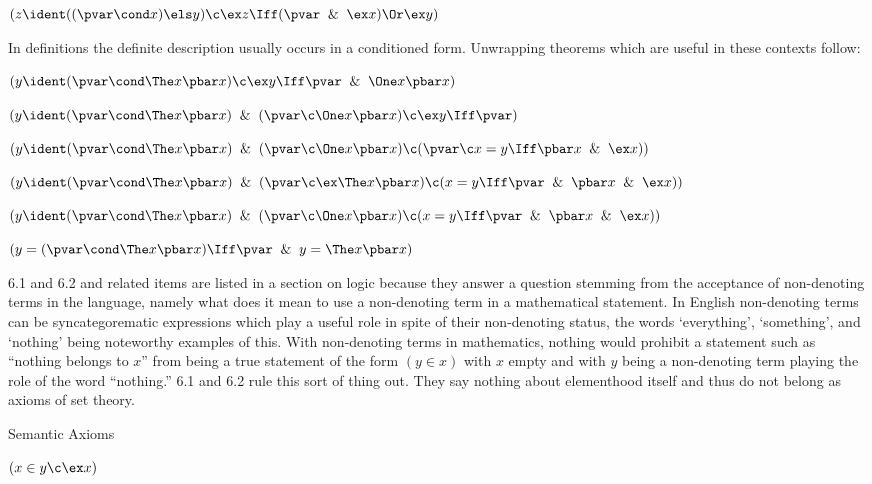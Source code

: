  $(z \ident ((\pvar \cond x) \els y) \c \ex z \Iff (\pvar \And \ex x)\Or \ex y)$
\lineb


In definitions the definite description usually occurs in a conditioned form.
Unwrapping theorems which are useful in these contexts follow:
	\lineb

 $(y \ident(\pvar \cond\The x\pbar x)
\c \ex y \Iff \pvar \And \One x\pbar x)$

 $(y \ident(\pvar \cond\The x\pbar x)
\And (\pvar \c \One x\pbar x)
\c \ex y \Iff \pvar )$

 $(y \ident (\pvar \cond \The x\pbar x) \And
	(\pvar \c \One x \pbar x) 
	\c (\pvar \c x = y \Iff \pbar x \And \ex x)) $

 $(y \ident (\pvar \cond \The x\pbar x) \And
	(\pvar \c \ex \The x \pbar x) 
	\c (x = y \Iff \pvar \And \pbar x \And \ex x)) $

 $(y \ident (\pvar \cond \The x\pbar x) \And
	(\pvar \c \One x \pbar x) 
	\c (x = y \Iff \pvar \And \pbar x \And \ex x)) $

 $(y = (\pvar \cond \The x \pbar x) \Iff \pvar \And y = \The x \pbar x)$
	\lineb



	\lineb

6.1 and 6.2 and related items are listed in a section on logic because
they answer a question stemming from the acceptance of non-denoting 
terms  in the language,  namely what  does it mean to use a non-denoting
term in a mathematical statement.  In English non-denoting terms can
be syncategorematic expressions which play a useful role in spite
of their non-denoting status,  the words `everything', `something', and `nothing'
being noteworthy examples of this.  With non-denoting terms in mathematics,
nothing would prohibit a statement such as ``nothing belongs to $x$'' from being a true
statement of the form $(y \in x)$ with $x$ empty and
with $y$ being a non-denoting term playing the role of the word ``nothing.''
6.1 and 6.2 rule this sort of thing out.   They say nothing about elementhood
itself
and thus do not belong as axioms of set theory.  
	\lineb


 


\noindent{}Semantic Axioms

 $(x \in y \c \ex x)$

